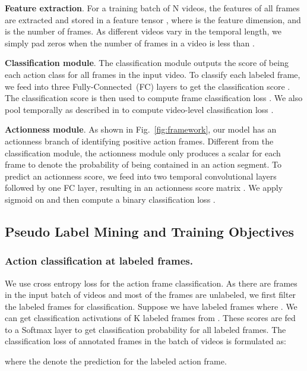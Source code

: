 \documentclass[runningheads]{llncs}
\begin{document}
	\noindent\textbf{Feature extraction}. For a training batch of N videos, the features of all frames are extracted and stored in a feature tensor  , where  is the feature dimension, and  is the number of frames.
	As different videos vary in the temporal length, we simply pad zeros when the number of frames in a video is less than . 
	
	\noindent\textbf{Classification module}. 
	The classification module outputs the score of being each action class for all frames in the input video. To classify each labeled frame, we feed  into three Fully-Connected~(FC) layers to get the classification score . The classification score  is then used to compute frame classification loss .
	We also pool  temporally as described in \cite{Narayan_2019_ICCV} to compute video-level classification loss .


	
	\noindent\textbf{Actionness module}. As shown in Fig.~\ref{fig:framework}, our model has an actionness branch of identifying positive action frames. Different from the classification module, the actionness module only produces a scalar for each frame to denote the probability of being contained in an action segment. To predict an actionness score, we feed  into two temporal convolutional layers followed by one FC layer, resulting in an actionness score matrix . We apply sigmoid on  and then compute a binary classification loss .
	
	
	
	
	\subsection{Pseudo Label Mining and Training Objectives}
	
	\subsubsection{Action classification at labeled frames.}
	We use cross entropy loss for the action frame classification.
	As there are  frames in the input batch of videos and most of the frames are unlabeled, we first filter the labeled frames for classification.
	Suppose we have  labeled frames where .
	We can get classification activations of K labeled frames from . These scores are fed to a Softmax layer to get classification probability  for all labeled frames.  The classification loss of annotated frames in the batch of videos is formulated as:
	
	where the  denote the prediction for the  labeled action frame.
\end{document}
